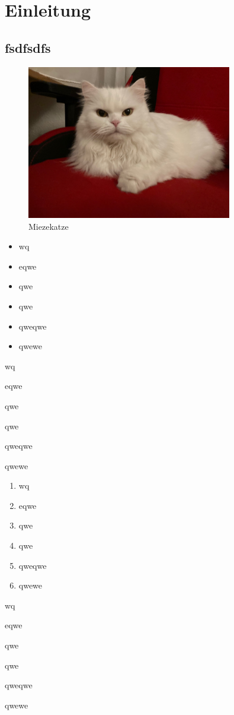 \chapter{Einleitung}

\section{fsdfsdfs}

\blindtext[10]

\begin{figure}
\begin{center}
\includegraphics[width=0.8\textwidth]{Bilder/Katze.jpg}
\end{center}
\caption{Miezekatze}\label{fig:mieze}
\end{figure}


\blindtext[10]

\begin{itemize}
	\item wq
	\item eqwe
	\item qwe
	\item qwe
	\item qweqwe
	\item qwewe
\end{itemize}

\begin{compactitem}
	\item wq
	\item eqwe
	\item qwe
	\item qwe
	\item qweqwe
	\item qwewe
\end{compactitem}


\begin{enumerate}
	\item wq
	\item eqwe
	\item qwe
	\item qwe
	\item qweqwe
	\item qwewe
\end{enumerate}

\begin{compactenum}
	\item wq
	\item eqwe
	\item qwe
	\item qwe
	\item qweqwe
	\item qwewe
\end{compactenum}